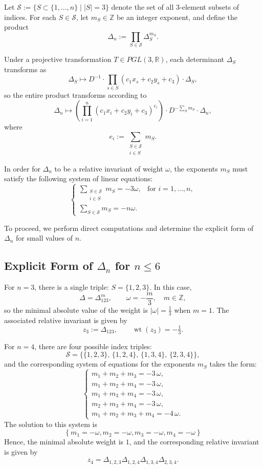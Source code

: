 \documentclass[12pt,reqno]{amsart}
\begin{document}
Let \(\mathcal{S} := \bigl\{ S \subset \{1, \dots, n\} \mid |S| = 3 \bigr\}\) denote the set of all 3-element subsets of indices. For each \( S \in \mathcal{S} \), let \( m_S \in \mathbb{Z} \) be an integer exponent, and define the product
\[
\Delta_n := \prod_{S \in \mathcal{S}} \Delta_S^{m_S}.
\]

Under a projective transformation \(T \in PGL(3,\mathbb{R})\), each determinant \(\Delta_S\) transforms as
\[
\Delta_S \mapsto D^{-1} \cdot \prod_{s \in S} (c_1 x_s + c_2 y_s + c_3) \cdot \Delta_S,
\]
so the entire product transforms according to
\[
\Delta_n \mapsto \left( \prod_{i=1}^n (c_1 x_i + c_2 y_i + c_3)^{e_i} \right)
\cdot D^{-\sum_S m_S} \cdot \Delta_n,
\]
where
\[
e_i := \sum_{\substack{S \in \mathcal{S} \\ i \in S}} m_S.
\]

In order for \(\Delta_n\) to be a relative invariant of weight \(\omega\), the exponents \(m_S\) must satisfy the following system of linear equations:
\begin{equation}\label{eq:weights}
\begin{cases}
\displaystyle\sum_{\substack{S \in \mathcal{S} \\ i \in S}} m_S = -3\omega, & \text{for } i = 1, \dots, n, \\
\displaystyle\sum_{S \in \mathcal{S}} m_S = -n\omega. &
\end{cases}
\end{equation}


To proceed, we perform direct computations and determine the explicit form of \(\Delta_n\) for small values of \(n\).


\subsection{ Explicit Form of \(\Delta_n\) for \(n \leq 6\)}

For \(n = 3\), there is a single triple: \(S = \{1, 2, 3\}\). In this case,
\[
\Delta = \Delta_{123}^m, \qquad
\omega = -\frac{m}{3}, \quad m \in \mathbb{Z},
\]
so the minimal absolute value of the weight is  \(|\omega| = \tfrac{1}{3}\) when \(m = 1\). The associated relative invariant is given by
\[
z_3 := \Delta_{123}, \qquad \operatorname{wt}(z_3) = -\tfrac{1}{3}.
\]


For \(n = 4\), there are four possible index triples:
\[
\mathcal{S} = \{\{1,2,3\},\, \{1,2,4\},\, \{1,3,4\},\, \{2,3,4\}\},
\]
and the corresponding system of equations for the exponents \(m_S\) takes the form:
$$
\begin{cases}
m_{{1}}+m_{{2}}+m_{{3}}=-3\,\omega, \\
m_{{1}}+m_{{2}}+m_{{4}}=-3\,\omega, \\
m_{{1}}+m_{{3}}+m_{{4}}=-3\,\omega, \\
m_{{2}}+m_{{3}}+m_{{4}}=-3\,\omega,\\
m_{{1}}+m_{{2}}+m_{{3}}+m_{{4}}=-4\,\omega. 
\end{cases}
$$
The  solution to this system is
$$
\left\{ m_{{1}}=-\omega,m_{{2}}=-\omega,m_{{3}}=-\omega,m_{{4}}=-\omega \right\} 
$$
Hence, the minimal absolute weight is \(1\), and the corresponding relative invariant is given by
$$
z_4=\Delta_{{1,2,3}}\Delta_{{1,2,4}}\Delta_{{1,3,4}}\Delta_{{2,3,4}}.
$$
\end{document}
